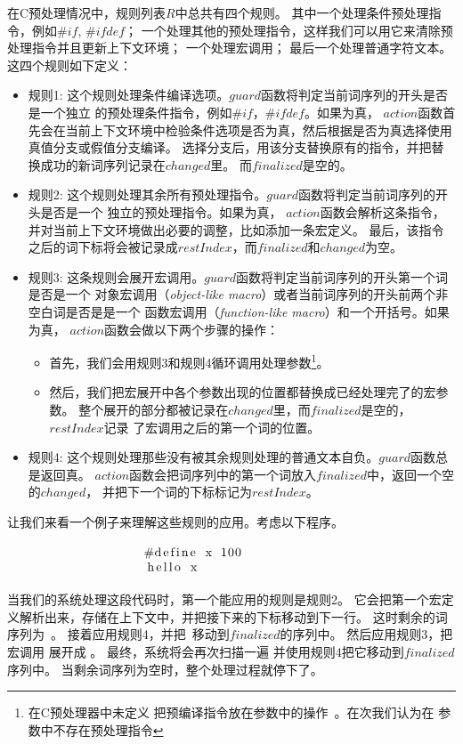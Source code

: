 在C预处理情况中，规则列表$R$中总共有四个规则。
其中一个处理条件预处理指令，例如$\#if$, $\#ifdef$；
一个处理其他的预处理指令，这样我们可以用它来清除预处理指令并且更新上下文环境；
一个处理宏调用；
最后一个处理普通字符文本。
这四个规则如下定义：

\begin{itemize}
\item 规则1: 这个规则处理条件编译选项。$guard$函数将判定当前词序列的开头是否是一个独立
  的预处理条件指令，例如$\#if$，$\#ifdef$。如果为真，
  $action$函数首先会在当前上下文环境中检验条件选项是否为真，然后根据是否为真选择使用
  真值分支或假值分支编译。
  选择分支后，用该分支替换原有的指令，并把替换成功的新词序列记录在$changed$里。
  而$finalized$是空的。
\item 规则2: 这个规则处理其余所有预处理指令。$guard$函数将判定当前词序列的开头是否是一个
  独立的预处理指令。如果为真，
  $action$函数会解析这条指令，并对当前上下文环境做出必要的调整，比如添加一条宏定义。
  最后，该指令之后的词下标将会被记录成$restIndex$，而$finalized$和$changed$为空。
\item 规则3: 这条规则会展开宏调用。$guard$函数将判定当前词序列的开头第一个词是否是一个
  对象宏调用（\emph{object-like macro}）或者当前词序列的开头前两个非空白词是否是是一个
  函数宏调用（\emph{function-like macro}）和一个开括号。如果为真，
  $action$函数会做以下两个步骤的操作：
  \begin{itemize}
  \item 首先，我们会用规则3和规则4循环调用处理参数\footnote{在C预处理器中未定义
    把预编译指令放在参数中的操作~\parencite{CStandard}。在次我们认为在
    参数中不存在预处理指令}。
  \item 然后，我们把宏展开中各个参数出现的位置都替换成已经处理完了的宏参数。
    整个展开的部分都被记录在$changed$里，而$finalized$是空的，$restIndex$记录
    了宏调用之后的第一个词的位置。
  \end{itemize}
\item 规则4: 这个规则处理那些没有被其余规则处理的普通文本自负。$guard$函数总是返回真。
  $action$函数会把词序列中的第一个词放入$finalized$中，返回一个空的$changed$，
  并把下一个词的下标标记为$restIndex$。
\end{itemize}

让我们来看一个例子来理解这些规则的应用。考虑以下程序。
\begin{equation}
\begin{minipage}{0.4\columnwidth}
\begin{lstlisting}
#define x 100
hello x
\end{lstlisting}
\end{minipage}
\label{eqn:smallexample}
\end{equation}
当我们的系统处理这段代码时，第一个能应用的规则是规则2。
它会把第一个宏定义解析出来，存储在上下文中，并把接下来的下标移动到下一行。
这时剩余的词序列为~。
接着应用规则4，并把~移动到$finalized$的序列中。
然后应用规则3，把宏调用  展开成 。
最终，系统将会再次扫描一遍  并使用规则4把它移动到$finalized$序列中。
当剩余词序列为空时，整个处理过程就停下了。

